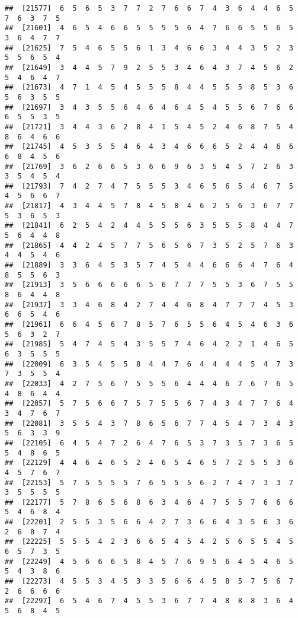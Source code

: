 \documentclass[
]{book}
\begin{document}
\begin{verbatim}
##  [21577]  6  5  6  5  3  7  7  2  7  6  6  7  4  3  6  4  4  6  5  7  6  3  7  5
##  [21601]  4  6  5  4  6  6  5  5  5  5  6  4  7  6  6  5  5  6  5  3  6  4  7  7
##  [21625]  7  5  4  6  5  5  6  1  3  4  6  6  3  4  4  3  5  2  3  5  5  6  5  4
##  [21649]  3  4  4  5  7  9  2  5  5  3  4  6  4  3  7  4  5  6  2  5  4  6  4  7
##  [21673]  4  7  1  4  5  4  5  5  5  8  4  4  5  5  5  8  5  3  6  5  6  3  5  5
##  [21697]  3  4  3  5  5  6  4  6  4  6  4  5  4  5  5  6  7  6  6  6  5  5  3  5
##  [21721]  3  4  4  3  6  2  8  4  1  5  4  5  2  4  6  8  7  5  4  8  6  4  6  6
##  [21745]  4  5  3  5  5  4  6  4  3  4  6  6  6  5  2  4  4  6  6  6  8  4  5  6
##  [21769]  3  6  2  6  6  5  3  6  6  9  6  3  5  4  5  7  2  6  3  3  5  4  5  4
##  [21793]  7  4  2  7  4  7  5  5  5  3  4  6  5  6  5  4  6  7  5  4  5  6  6  7
##  [21817]  4  3  4  4  5  7  8  4  5  8  4  6  2  5  6  3  6  7  7  5  3  6  5  3
##  [21841]  6  2  5  4  2  4  4  5  5  5  6  3  5  5  5  8  4  4  7  5  6  4  4  8
##  [21865]  4  4  2  4  5  7  7  5  6  5  6  7  3  5  2  5  7  6  3  4  4  5  4  6
##  [21889]  3  3  6  4  5  3  5  7  4  5  4  4  6  6  6  4  7  6  4  8  5  5  6  3
##  [21913]  3  5  6  6  6  6  6  5  6  7  7  7  5  5  3  6  7  5  5  8  6  4  4  8
##  [21937]  3  3  4  6  8  4  2  7  4  4  6  8  4  7  7  7  4  5  3  6  6  5  4  6
##  [21961]  6  6  4  5  6  7  8  5  7  6  5  5  6  4  5  4  6  3  6  5  6  3  2  7
##  [21985]  5  4  7  4  5  4  3  5  5  7  4  6  4  2  2  1  4  6  5  6  3  5  5  5
##  [22009]  6  3  5  4  5  5  8  4  4  7  6  4  4  4  4  5  4  7  3  7  3  5  5  4
##  [22033]  4  2  7  5  6  7  5  5  5  6  4  4  4  6  7  6  7  6  5  4  8  6  4  4
##  [22057]  5  7  5  6  6  7  5  7  5  5  6  7  4  3  4  7  7  6  4  3  4  7  6  7
##  [22081]  3  5  5  4  3  7  8  6  5  6  7  7  4  5  4  7  3  4  3  5  6  3  3  9
##  [22105]  6  4  5  4  7  2  6  4  7  6  5  3  7  3  5  7  3  6  5  5  4  8  6  5
##  [22129]  4  4  6  4  6  5  2  4  6  5  4  6  5  7  2  5  5  3  6  4  5  7  6  7
##  [22153]  5  7  5  5  5  5  7  6  5  5  5  6  2  7  4  7  3  3  7  3  5  5  5  5
##  [22177]  5  7  8  6  5  6  8  6  3  4  6  4  7  5  5  7  6  6  6  5  4  6  8  4
##  [22201]  2  5  5  3  5  6  6  4  2  7  3  6  6  4  3  5  6  3  6  2  6  8  7  4
##  [22225]  5  5  5  4  2  3  6  6  5  4  5  4  2  5  6  5  5  4  5  6  5  7  3  5
##  [22249]  4  5  6  6  6  5  8  4  5  7  6  9  5  6  4  5  4  6  5  5  4  3  8  6
##  [22273]  4  5  5  3  4  5  3  3  5  6  6  4  5  8  5  7  5  6  7  2  6  6  6  6
##  [22297]  6  5  4  6  7  4  5  5  3  6  7  7  4  8  8  8  3  6  4  5  6  8  4  5

\end{verbatim}
\end{document}
